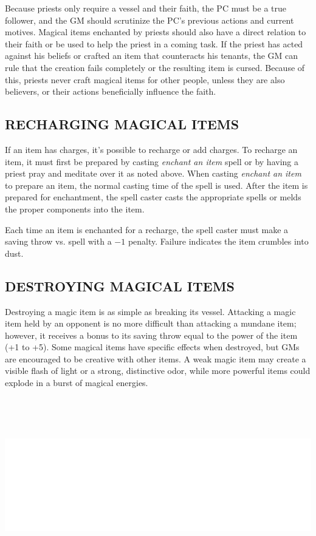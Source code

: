 \begin{multicols}{2}
Because priests only require a vessel and their faith, the PC must be a true follower, and the GM should scrutinize the PC's previous actions and current motives.  Magical items enchanted by priests should also have a direct relation to their faith or be used to help the priest in a coming task.  If the priest has acted against his beliefs or crafted an item that counteracts his tenants, the GM can rule that the creation fails completely or the resulting item is cursed.  Because of this, priests never craft magical items for other people, unless they are also believers, or their actions beneficially influence the faith.
 
\subsection{RECHARGING MAGICAL ITEMS}

If an item has charges, it's possible to recharge or add charges.  To recharge an item, it must first be prepared by casting \textit{enchant an item} spell or by having a priest pray and meditate over it as noted above.  When casting \textit{enchant an item} to prepare an item, the normal casting time of the spell is used.  After the item is prepared for enchantment, the spell caster casts the appropriate spells or melds the proper components into the item. 
 
Each time an item is enchanted for a recharge, the spell caster must make a saving throw vs. spell with a $-1$ penalty.  Failure indicates the item crumbles into dust.
 
\subsection{DESTROYING MAGICAL ITEMS}

Destroying a magic item is as simple as breaking its vessel.  Attacking a magic item held by an opponent is no more difficult than attacking a mundane item; however, it receives a bonus to its saving throw equal to the power of the item (+1 to +5).  Some magical items have specific effects when destroyed, but GMs are encouraged to be creative with other items.  A weak magic item may create a visible flash of light or a strong, distinctive odor, while more powerful items could explode in a burst of magical energies.

\end{multicols}

\noindent\includegraphics[width=6.75in, height=3in]{testblock.pdf} 


